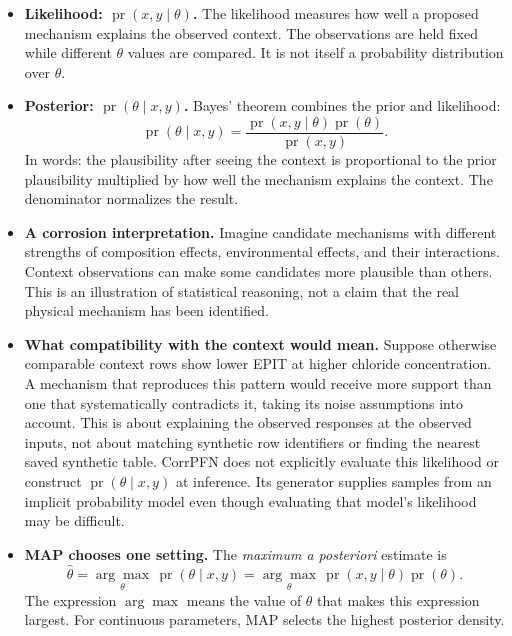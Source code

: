 \documentclass[11pt]{article}
\newcommand{\pr}{\operatorname{pr}}
\newenvironment{notes}
  {\begin{itemize}\setlength{\itemsep}{0.45em}\setlength{\parsep}{0pt}}
  {\end{itemize}}
\begin{document}
\begin{notes}
    \item \textbf{Likelihood: \(\pr(x,y\mid\theta)\).} The likelihood
    measures how well a proposed mechanism explains the observed
    context. The observations are held fixed while different
    \(\theta\) values are compared. It is not itself a probability
    distribution over \(\theta\).

    \item \textbf{Posterior: \(\pr(\theta\mid x,y)\).}
    Bayes' theorem combines the prior and likelihood:
    \begin{equation}
        \pr(\theta\mid x,y)
        =
        \frac{\pr(x,y\mid\theta)\pr(\theta)}
             {\pr(x,y)}.
        \label{eq:bayes-posterior}
    \end{equation}
    In words: the plausibility after seeing the context is
    proportional to the prior plausibility multiplied by how well
    the mechanism explains the context. The denominator normalizes
    the result.

    \item \textbf{A corrosion interpretation.} Imagine candidate
    mechanisms with different strengths of composition effects,
    environmental effects, and their interactions. Context
    observations can make some candidates more plausible than others.
    This is an illustration of statistical reasoning, not a claim
    that the real physical mechanism has been identified.

    \item \textbf{What compatibility with the context would mean.}
    Suppose otherwise comparable context rows show lower EPIT at
    higher chloride concentration. A mechanism that reproduces
    this pattern would receive more support than one that
    systematically contradicts it, taking its noise assumptions
    into account. This is about explaining the observed responses
    at the observed inputs, not about matching synthetic row
    identifiers or finding the nearest saved synthetic table.
    CorrPFN does not explicitly evaluate this likelihood or
    construct \(\pr(\theta\mid x,y)\) at inference. Its generator
    supplies samples from an implicit probability model even
    though evaluating that model's likelihood may be difficult.

    \item \textbf{MAP chooses one setting.} The
    \emph{maximum a posteriori} estimate is
    \begin{equation}
        \widehat\theta
        =
        \underset{\theta}{\arg\max}\,
        \pr(\theta\mid x,y)
        =
        \underset{\theta}{\arg\max}\,
        \pr(x,y\mid\theta)\pr(\theta).
        \label{eq:map-estimate}
    \end{equation}
    The expression \(\arg\max\) means the value of \(\theta\)
    that makes this expression largest. For continuous
    parameters, MAP selects the highest posterior density.


\end{notes}
\end{document}
